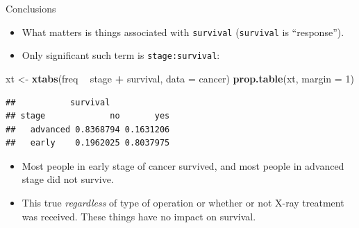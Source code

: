 \documentclass[
  ignorenonframetext,
]{beamer}
\newenvironment{Shaded}{\begin{snugshade}}{\end{snugshade}}
\newcommand{\DataTypeTok}[1]{\textcolor[rgb]{0.13,0.29,0.53}{#1}}
\newcommand{\DecValTok}[1]{\textcolor[rgb]{0.00,0.00,0.81}{#1}}
\newcommand{\KeywordTok}[1]{\textcolor[rgb]{0.13,0.29,0.53}{\textbf{#1}}}
\newcommand{\NormalTok}[1]{#1}
\newcommand{\OperatorTok}[1]{\textcolor[rgb]{0.81,0.36,0.00}{\textbf{#1}}}
\newcommand{\StringTok}[1]{\textcolor[rgb]{0.31,0.60,0.02}{#1}}
\begin{document}
\begin{frame}[fragile]{Conclusions}
\protect\hypertarget{conclusions-5}{}

\begin{itemize}
\item
  What matters is things associated with \texttt{survival}
  (\texttt{survival} is ``response'').
\item
  Only significant such term is \texttt{stage:survival}:
\end{itemize}

\begin{Shaded}
\begin{Highlighting}[]
\NormalTok{xt <-}\StringTok{ }\KeywordTok{xtabs}\NormalTok{(freq }\OperatorTok{~}\StringTok{ }\NormalTok{stage }\OperatorTok{+}\StringTok{ }\NormalTok{survival, }\DataTypeTok{data =}\NormalTok{ cancer)}
\KeywordTok{prop.table}\NormalTok{(xt, }\DataTypeTok{margin =} \DecValTok{1}\NormalTok{)}
\end{Highlighting}
\end{Shaded}

\begin{verbatim}
##           survival
## stage             no       yes
##   advanced 0.8368794 0.1631206
##   early    0.1962025 0.8037975
\end{verbatim}

\begin{itemize}
\item
  Most people in early stage of cancer survived, and most people in
  advanced stage did not survive.
\item
  This true \emph{regardless} of type of operation or whether or not
  X-ray treatment was received. These things have no impact on survival.
\end{itemize}

\end{frame}
\end{document}
